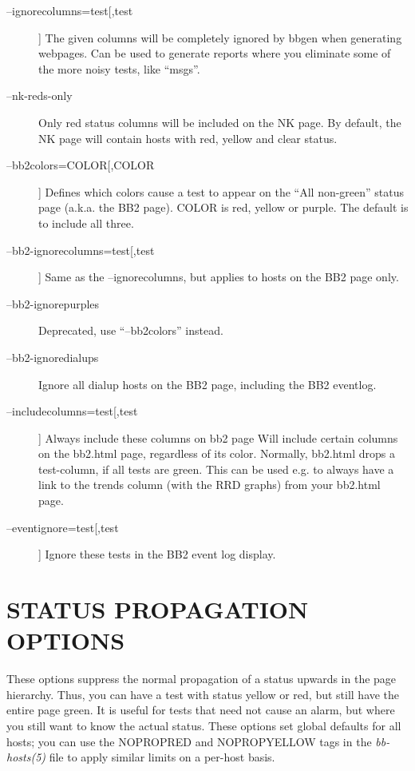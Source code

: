  \begin{description}
\item[--ignorecolumns=test[,test]] The given columns will be
  completely ignored by bbgen when generating webpages. Can be used to
  generate reports where you eliminate some of the more noisy tests,
  like ``msgs''. 


 

\item[--nk-reds-only] Only red status columns will be included on the
  NK page. By default, the NK page will contain hosts with red, yellow
  and clear status. 


 

\item[--bb2colors=COLOR[,COLOR]] Defines which colors cause a test to
  appear on the ``All non-green'' status page (a.k.a. the BB2
  page). COLOR is red, yellow or purple. The default is to include all
  three. 


 

\item[--bb2-ignorecolumns=test[,test]] Same as the --ignorecolumns, but applies to hosts on the BB2 page only. 

 

\item[--bb2-ignorepurples] Deprecated, use ``--bb2colors'' instead. 

 

\item[--bb2-ignoredialups] Ignore all dialup hosts on the BB2 page, including the BB2 eventlog. 

 

\item[--includecolumns=test[,test]] Always include these columns on
  bb2 page Will include certain columns on the bb2.html page,
  regardless of its color. Normally, bb2.html drops a test-column, if
  all tests are green. This can be used e.g. to always have a link to
  the trends column (with the RRD graphs) from your bb2.html page. 


 

\item[--eventignore=test[,test]] Ignore these tests in the BB2 event log display. 

 


\end{description}

\section{STATUS PROPAGATION OPTIONS}
 These options suppress the normal propagation of a status upwards in
 the page hierarchy. Thus, you can have a test with status yellow or
 red, but still have the entire page green. It is useful for tests
 that need not cause an alarm, but where you still want to know the
 actual status. These options set global defaults for all hosts; you
 can use the NOPROPRED and NOPROPYELLOW tags in the \emph{bb-hosts(5)}
 file to apply similar limits on a per-host basis. 


